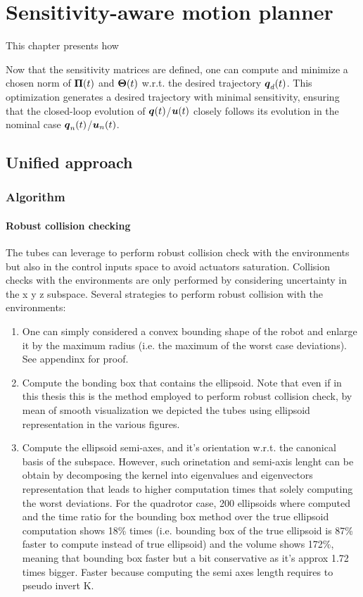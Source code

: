 \chapter{Sensitivity-aware motion planner}

This chapter presents how 

Now that the sensitivity matrices are defined, one can compute and minimize a chosen norm of $\boldsymbol{\Pi}(t)$ and $\boldsymbol{\Theta}(t)$ w.r.t. the desired trajectory $\boldsymbol{q}_d(t)$. 
This optimization generates a desired trajectory with minimal sensitivity, ensuring that the closed-loop evolution of $\boldsymbol{q}(t)$/$\boldsymbol{u}(t)$ closely follows its evolution in the nominal case $\boldsymbol{q}_n(t)$/$\boldsymbol{u}_n(t)$.

\section{Unified approach}
\subsection{Algorithm}
\subsubsection{Robust collision checking}
The tubes can leverage to perform robust collision check with the environments but also in the control inputs space to avoid actuators saturation. 
Collision checks with the environments are only performed by considering uncertainty in the x y z subspace.
Several strategies to perform robust collision with the environments:
\begin{enumerate}
    \item One can simply considered a convex bounding shape of the robot and enlarge it by the maximum radius (i.e. the maximum of the worst case deviations). See appendinx for proof.
    \item Compute the bonding box that contains the ellipsoid. Note that even if in this thesis this is the method employed to perform robust collision check, by mean of smooth visualization we depicted the tubes using ellipsoid representation in the various figures.
    \item Compute the ellipsoid semi-axes, and it's orientation w.r.t. the canonical basis of the subspace. However, such orinetation and semi-axis lenght can be obtain by decomposing the kernel into eigenvalues and eigenvectors representation that leads to higher computation times that solely computing the worst deviations. For the quadrotor case, 200 ellipsoids where computed and the time ratio for the bounding box method over the true ellipsoid computation shows 18\% times (i.e. bounding box of the true ellipsoid is 87\% faster to compute instead of true ellipsoid) and the volume shows 172\%, meaning that bounding box faster but a bit conservative as it's approx 1.72 times bigger. Faster because computing the semi axes length requires to pseudo invert K.
\end{enumerate}
